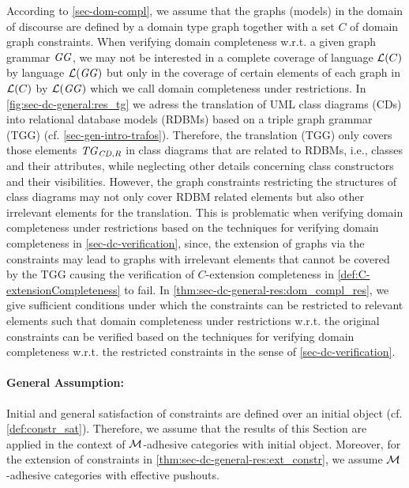 According to \cref{sec-dom-compl}, we assume that the graphs (models) in the domain of discourse are defined by a domain type graph together with a set $C$ of domain graph constraints.
When verifying domain completeness w.r.t. a given graph grammar $\mathit{GG}$, we may not be interested in a complete coverage of language $\mathcal{L}(C)$ by language $\mathcal{L}(\mathit{GG})$ but only in the coverage of certain elements of each graph in $\mathcal{L}(C)$ by $\mathcal{L}(\mathit{GG})$ which we call domain completeness under restrictions.
In \cref{fig:sec-dc-general:res_tg} we adress the translation of UML class diagrams (CDs) into relational database models (RDBMs) based on a triple graph grammar (TGG) (cf. \cref{sec-gen-intro-trafos}).
Therefore, the translation (TGG) only covers those elements $\mathit{TG}_{\mathit{CD},R}$ in class diagrams that are related to RDBMs, i.e., classes and their attributes, while neglecting other details concerning class constructors and their visibilities.
However, the graph constraints restricting the structures of class diagrams may not only cover RDBM related elements but also other irrelevant elements for the translation.
This is problematic when verifying domain completeness under restrictions based on the techniques for verifying domain completeness in \cref{sec-dc-verification}, since, the extension of graphs via the constraints may lead to graphs with irrelevant elements that cannot be covered by the TGG causing the verification of $C$-extension completeness in \cref{def:C-extensionCompleteness} to fail.
In \cref{thm:sec-dc-general-res:dom_compl_res}, we give sufficient conditions under which the constraints can be restricted to relevant elements such that domain completeness under restrictions w.r.t. the original constraints can be verified based on the techniques for verifying domain completeness w.r.t. the restricted constraints in the sense of \cref{sec-dc-verification}.

\paragraph*{General Assumption:}
Initial and general satisfaction of constraints are defined over an initial object (cf. \cref{def:constr_sat}).
Therefore, we assume that the results of this Section are applied in the context of ${\cal M}$-adhesive categories with initial object.
Moreover, for the extension of constraints in \cref{thm:sec-dc-general-res:ext_constr}, we assume ${\cal M}$-adhesive categories with effective pushouts.

